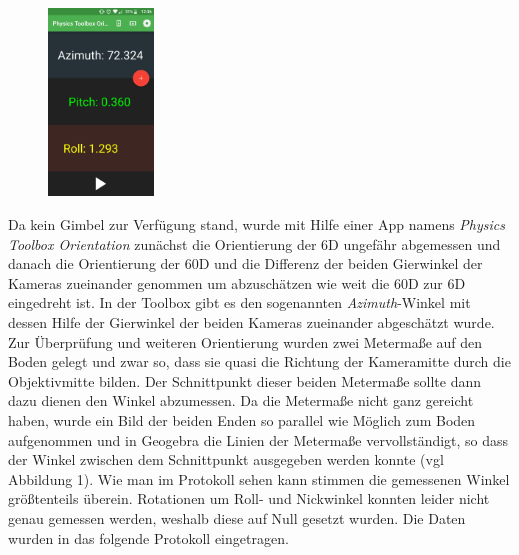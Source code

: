 \begin{figure}
	\centering
	\includegraphics[width=0.25\textwidth]{Images/1_6D_Orientation_PT.png}
\end{figure}	
Da kein Gimbel zur Verfügung stand, wurde mit Hilfe einer App namens \textit{Physics Toolbox Orientation} zunächst die Orientierung der 6D ungefähr abgemessen und danach die Orientierung der 60D und die Differenz der beiden Gierwinkel der Kameras zueinander genommen um abzuschätzen wie weit die 60D zur 6D eingedreht ist. In der Toolbox gibt es den sogenannten \textit{Azimuth}-Winkel mit dessen Hilfe der Gierwinkel der beiden Kameras zueinander abgeschätzt wurde. Zur Überprüfung und weiteren Orientierung wurden zwei Metermaße auf den Boden gelegt und zwar so, dass sie quasi die Richtung der Kameramitte durch die Objektivmitte bilden. Der Schnittpunkt dieser beiden Metermaße sollte dann dazu dienen den Winkel abzumessen. Da die Metermaße nicht ganz gereicht haben, wurde ein Bild der beiden Enden so parallel wie Möglich zum Boden aufgenommen und in Geogebra die Linien der Metermaße vervollständigt, so dass der Winkel zwischen dem Schnittpunkt ausgegeben werden konnte (vgl Abbildung 1). Wie man im Protokoll sehen kann stimmen die gemessenen Winkel größtenteils überein. Rotationen um Roll- und Nickwinkel konnten leider nicht genau gemessen werden, weshalb diese auf Null gesetzt wurden. Die Daten wurden in das folgende Protokoll eingetragen.	





